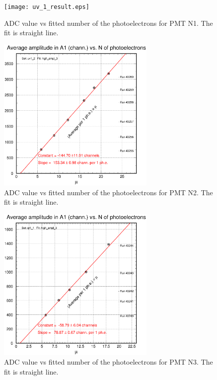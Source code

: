 \documentclass[11pt,titlepage]{article}
\begin{document}

 \begin{figure}
 \hspace{0.5cm}
 \begin{centering}
  \texttt{[image: uv\_1\_result.eps]}
 \vspace{0.5cm}
 \caption{\label{uv_1_result}
ADC value vs fitted number of the photoelectrons for PMT N1. The fit is straight line.}
\end{centering}
 \end{figure}


 \begin{figure}
 \hspace{0.5cm}
 \begin{centering}
  \includegraphics[height=7.5cm]{uv_2_result.eps}
 \vspace{0.5cm}
 \caption{\label{uv_2_result}
ADC value vs fitted number of the photoelectrons for PMT N2. The fit is straight line.}
\end{centering}
 \end{figure}


 \begin{figure}
 \hspace{0.5cm}
 \begin{centering}
  \includegraphics[height=7.5cm]{qt_1_result.eps}
 \vspace{0.5cm}
 \caption{\label{qt_1_result}
ADC value vs fitted number of the photoelectrons for PMT N3. The fit is straight line.}
\end{centering}
 \end{figure}
\end{document}
